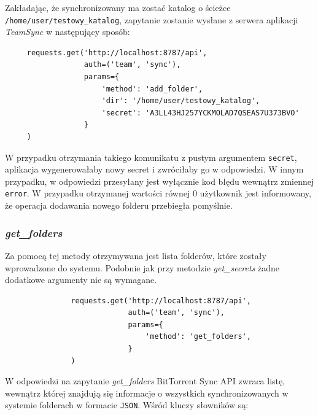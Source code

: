 Zakładając, że synchronizowany ma zostać katalog o ścieżce \texttt{/home/user/testowy\_katalog}, zapytanie zostanie wysłane z serwera aplikacji \emph{TeamSync} w następujący sposób:

\begin{minipage}{\linewidth}
\vspace{15pt}
\begin{verbatim}
     requests.get('http://localhost:8787/api',
                  auth=('team', 'sync'),
                  params={
                      'method': 'add_folder',
                      'dir': '/home/user/testowy_katalog',
                      'secret': 'A3LL43HJ257YCKMOLAD7QSEAS7U373BVO'
                  }
     )
\end{verbatim}
\vspace{15pt}
\end{minipage}

W przypadku otrzymania takiego komunikatu z pustym argumentem \texttt{secret}, aplikacja wygenerowałaby nowy secret i zwróciłaby go w odpowiedzi. W innym przypadku, w odpowiedzi przesyłany jest wyłącznie kod błędu wewnątrz zmiennej \texttt{error}. W przypadku otrzymanej wartości równej $0$ użytkownik jest informowany, że operacja dodawania nowego folderu przebiegła pomyślnie.

\subsubsection*{\emph{get\_folders}}

Za pomocą tej metody otrzymywana jest lista folderów, które zostały wprowadzone do systemu. Podobnie jak przy metodzie \emph{get\_secrets} żadne dodatkowe argumenty nie są wymagane.

\begin{minipage}{\linewidth}
\vspace{15pt}
\begin{verbatim}
               requests.get('http://localhost:8787/api',
                            auth=('team', 'sync'),
                            params={
                                'method': 'get_folders',
                            }
               )
\end{verbatim}
\vspace{15pt}
\end{minipage}

W odpowiedzi na zapytanie \emph{get\_folders} BitTorrent Sync API zwraca listę, wewnątrz której znajdują się informacje o wszystkich synchronizowanych w systemie folderach w formacie \texttt{JSON}. Wśród kluczy słowników są:

